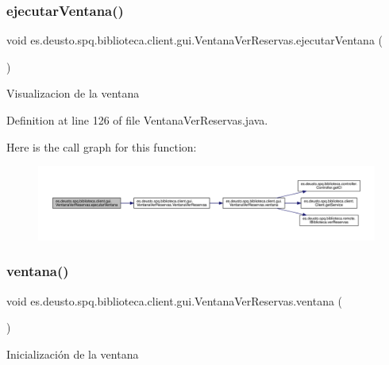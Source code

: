 \subsubsection{\texorpdfstring{ejecutar\+Ventana()}{ejecutarVentana()}}
{\footnotesize\ttfamily void es.\+deusto.\+spq.\+biblioteca.\+client.\+gui.\+Ventana\+Ver\+Reservas.\+ejecutar\+Ventana (\begin{DoxyParamCaption}{ }\end{DoxyParamCaption})}

Visualizacion de la ventana 

Definition at line 126 of file Ventana\+Ver\+Reservas.\+java.

Here is the call graph for this function\+:
\nopagebreak
\begin{figure}[H]
\begin{center}
\leavevmode
\includegraphics[width=350pt]{classes_1_1deusto_1_1spq_1_1biblioteca_1_1client_1_1gui_1_1_ventana_ver_reservas_ac90346a9b9d28091f5504b4213e7f30b_cgraph}
\end{center}
\end{figure}
\mbox{\label{classes_1_1deusto_1_1spq_1_1biblioteca_1_1client_1_1gui_1_1_ventana_ver_reservas_acb37e5558041a4fa7de51af1417a059f}} 
\subsubsection{\texorpdfstring{ventana()}{ventana()}}
{\footnotesize\ttfamily void es.\+deusto.\+spq.\+biblioteca.\+client.\+gui.\+Ventana\+Ver\+Reservas.\+ventana (\begin{DoxyParamCaption}{ }\end{DoxyParamCaption})}

Inicialización de la ventana 

